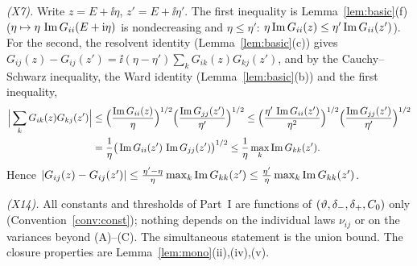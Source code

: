 \emph{\textup{(X7)}.} Write $z=E+\ii\eta$, $z'=E+\ii\eta'$. The first inequality is Lemma~\ref{lem:basic}(f) ($\eta\mapsto\eta\,\operatorname{Im} G_{ii}(E+\mathrm{i}\eta)$ is nondecreasing and $\eta\le\eta'$: $\eta\operatorname{Im} G_{ii}(z)\le\eta'\operatorname{Im} G_{ii}(z')$).
For the second, the resolvent identity (Lemma~\ref{lem:basic}(c)) gives $G_{ij}(z)-G_{ij}(z')=\ii(\eta-\eta')\sum_kG_{ik}(z)G_{kj}(z')$, and by the Cauchy--Schwarz inequality, the Ward identity (Lemma~\ref{lem:basic}(b)) and the first inequality,
\begin{align*}
 \Big|\sum_kG_{ik}(z)G_{kj}(z')\Big|&\le\Big(\frac{\operatorname{Im} G_{ii}(z)}{\eta}\Big)^{1/2}\Big(\frac{\operatorname{Im} G_{jj}(z')}{\eta'}\Big)^{1/2}\le\Big(\frac{\eta'\,\operatorname{Im} G_{ii}(z')}{\eta^2}\Big)^{1/2}\Big(\frac{\operatorname{Im} G_{jj}(z')}{\eta'}\Big)^{1/2}\\
 &=\frac1\eta\big(\operatorname{Im} G_{ii}(z')\,\operatorname{Im} G_{jj}(z')\big)^{1/2}\le\frac1\eta\max_k\operatorname{Im} G_{kk}(z').
\end{align*}
Hence $|G_{ij}(z)-G_{ij}(z')|\le\frac{\eta'-\eta}{\eta}\max_k\operatorname{Im} G_{kk}(z')\le\frac{\eta'}\eta\max_k\operatorname{Im} G_{kk}(z')$.

\emph{\textup{(X14)}.} All constants and thresholds of Part~I are functions of $(\vartheta,\delta_-,\delta_+,C_0)$ only (Convention~\ref{conv:const}); nothing depends on the individual laws $\nu_{ij}$ or on the variances beyond (A)--(C). The simultaneous statement is the union bound.
The closure properties are Lemma~\ref{lem:mono}(ii),(iv),(v).

